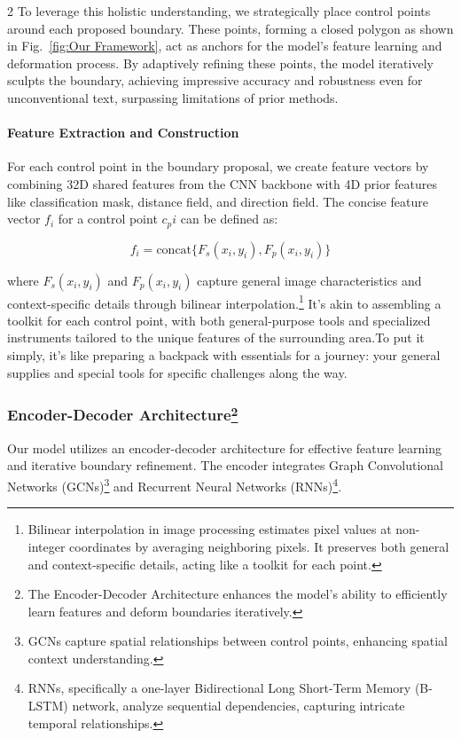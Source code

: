 \documentclass[sn-mathphys,Numbered]{sn-jnl}%
\begin{document}
\begin{multicols}{2}
To leverage this holistic understanding, we strategically place control points around each proposed boundary. These points, forming a closed polygon as shown in Fig.~\ref{fig:Our Framework}, act as anchors for the model's feature learning and deformation process. By adaptively refining these points, the model iteratively sculpts the boundary, achieving impressive accuracy and robustness even for unconventional text, surpassing limitations of prior methods.

\paragraph{Feature Extraction and Construction}
For each control point in the boundary proposal, we create feature vectors by combining 32D shared features from the CNN backbone with 4D prior features like classification mask, distance field, and direction field. The concise feature vector $f_i$ for a control point $c_pi$ can be defined as:

\begin{equation}
	f_i = \text{concat}\{F_s(x_i, y_i), F_p(x_i, y_i)\}
\end{equation}

where $F_s(x_i, y_i)$ and $F_p(x_i, y_i)$ capture general image characteristics and context-specific details through bilinear interpolation.\protect\footnote{Bilinear interpolation in image processing estimates pixel values at non-integer coordinates by averaging neighboring pixels. It preserves both general and context-specific details, acting like a toolkit for each point.} It's akin to assembling a toolkit for each control point, with both general-purpose tools and specialized instruments tailored to the unique features of the surrounding area.To put it simply, it's like preparing a backpack with essentials for a journey: your general supplies and special tools for specific challenges along the way.

\subsubsection*{Encoder-Decoder Architecture\protect\footnote{The Encoder-Decoder Architecture enhances the model's ability to efficiently learn features and deform boundaries iteratively.}}

Our model utilizes an encoder-decoder architecture for effective feature learning and iterative boundary refinement. The encoder integrates Graph Convolutional Networks (GCNs)\protect\footnote{GCNs capture spatial relationships between control points, enhancing spatial context understanding.} and Recurrent Neural Networks (RNNs)\protect\footnote{RNNs, specifically a one-layer Bidirectional Long Short-Term Memory (B-LSTM) network, analyze sequential dependencies, capturing intricate temporal relationships.}.


\end{multicols}
\end{document}
